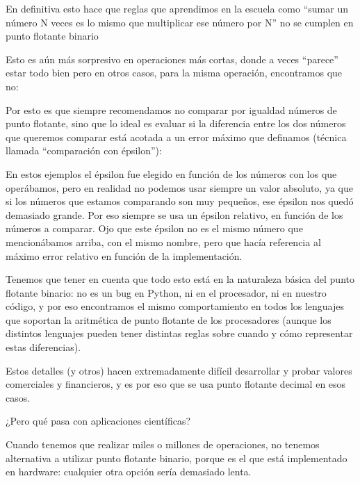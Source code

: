 
En definitiva esto hace que reglas que aprendimos en la escuela como ``sumar un número N veces es lo mismo que multiplicar ese número por N'' no se cumplen en punto flotante binario


Esto es aún más sorpresivo en operaciones más cortas, donde a veces ``parece'' estar todo bien pero en otros casos, para la misma operación, encontramos que no:


Por esto es que siempre recomendamos no comparar por igualdad números de punto flotante, sino que lo ideal es evaluar si la diferencia entre los dos números que queremos comparar está acotada a un error máximo que definamos (técnica llamada ``comparación con épsilon''):


En estos ejemplos el épsilon fue elegido en función de los números con los que operábamos, pero en realidad no podemos usar siempre un valor absoluto, ya que si los números que estamos comparando son muy pequeños, ese épsilon nos quedó demasiado grande. Por eso siempre se usa un épsilon relativo, en función de los números a comparar. Ojo que este épsilon no es el mismo número que mencionábamos arriba, con el mismo nombre, pero que hacía referencia al máximo error relativo en función de la implementación.

Tenemos que tener en cuenta que todo esto está en la naturaleza básica del punto flotante binario: no es un bug en Python, ni en el procesador, ni en nuestro código, y por eso encontramos el mismo comportamiento en todos los lenguajes que soportan la aritmética de punto flotante de los procesadores (aunque los distintos lenguajes pueden tener distintas reglas sobre cuando y cómo representar estas diferencias).

Estos detalles (y otros) hacen extremadamente difícil desarrollar y probar valores comerciales y financieros, y es por eso que se usa punto flotante decimal en esos casos.

¿Pero qué pasa con aplicaciones científicas?

Cuando tenemos que realizar miles o millones de operaciones, no tenemos alternativa a utilizar punto flotante binario, porque es el que está implementado en hardware: cualquier otra opción sería demasiado lenta.

